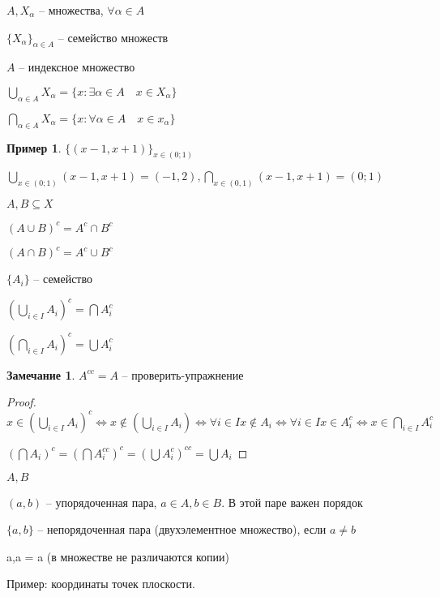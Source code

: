 \documentclass{book}
\theoremstyle{definition}
\newtheorem*{note}{Замечание}
\newtheorem*{example}{Пример}
\begin{document}
        \begin{definition}
            $A,X_{\alpha}$ -- множества, $\forall \alpha \in A$

            $\{X_{\alpha}\}_{\alpha\in A}$ -- семейство множеств

            $A$ -- индексное множество

            $\bigcup\limits_{\alpha\in A}X_{\alpha} = \{x:\exists \alpha\in A\quad x\in X_{\alpha}\} $

            $\bigcap\limits_{\alpha\in A}X_{\alpha} = \{x: \forall \alpha\in A\quad x\in x_{\alpha}\} $
        \end{definition}

        \begin{example}
            $\{(x-1,x+1)\}_{x\in (0;1)}$

            $\bigcup\limits_{x\in (0;1)}(x-1, x+1) = (-1,2) , \bigcap\limits_{x\in (0,1)} (x-1,x+1) = (0;1) $
        \end{example}

        \begin{definition}

            $A,B\subseteq X$

            $(A\cup B)^c = A^c\cap B^c$

            $(A\cap B)^c = A^c\cup B^c$
                

            $\{A_i\}$ -- семейство

            $(\bigcup\limits_{i\in I}A_i)^c  = \bigcap A_i^c$

            $\left( \bigcap\limits_{i \in  I} A_i \right) ^c = \bigcup A_i^c $
        \end{definition}
        \begin{note}
            $A^{c c} = A$ -- проверить-упражнение
        \end{note}

        \begin{proof}
            $x\in \left( \bigcup\limits_{i \in  I} A_i \right) ^c \iff  x\not\in \left( \bigcup\limits_{i \in  I} A_i \right) \iff \forall i\in I x\not\in A_i \iff  \forall i\in I x\in A_i^c \iff x\in \bigcap\limits_{i \in  I} A_i^c$

            $\left( \bigcap A_i \right) ^c = \left( \bigcap A_i^{c c} \right) ^c = \left( \bigcup A_i^c \right) ^{c c} = \bigcup A_i$
        \end{proof}

        \begin{definition}
            $A,B$

            $(a,b)$ -- упорядоченная пара, $a\in A, b\in B$. В этой паре важен порядок

            $\{a,b\}$ -- непорядоченная пара (двухэлементное множество), если $a\neq b$

            {a,a} = {a} (в множестве не различаются копии)
            
            Пример: координаты точек плоскости. 
        \end{definition}
\end{document}
